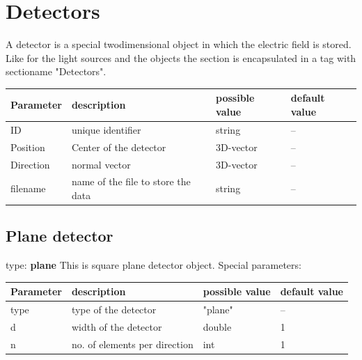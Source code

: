 \documentclass[a4paper,html,11pt,openany]{book}
\begin{document}
 \section{Detectors}
 A detector is a special twodimensional object in which the electric field is stored. Like for the light sources and the objects the section is encapsulated in a tag with sectioname "Detectors". 
  
 \vspace{1em} 
\begin{tabular}{p{2cm}|m{3.5cm}|p{3.0cm}|p{1.7cm}}
 Parameter  & description  & possible value & default value\\
 \hline
 ID & unique identifier & string & -- \\
 \hline
 Position & Center of the detector & 3D-vector & -- \\
 \hline
 Direction & normal vector & 3D-vector & -- \\
 \hline  
 filename & name of the file to store the data & string & -- \\
  \end{tabular}
  
 \subsection{Plane detector}
 type: \textbf{plane}
 This is square plane detector object. \newline
 Special parameters: 
 
 \vspace{1em} 
\begin{tabular}{p{2cm}|m{3.5cm}|m{3.0cm}|p{1.7cm}}
 Parameter  & description  & possible value & default value\\
 \hline 
 type & type of the detector & "plane" & -- \\
 \hline 
d & width of the detector & double & 1 \\
\hline
n & no. of elements per direction & int & 1 \\ 
\end{tabular}
\end{document}
